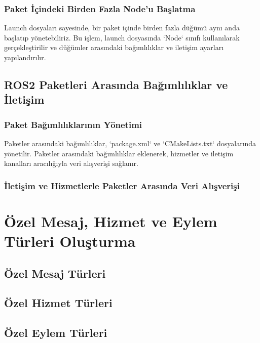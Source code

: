         \subsubsection{Paket İçindeki Birden Fazla Node'u Başlatma}
            Launch dosyaları sayesinde, bir paket içinde birden fazla düğümü aynı anda başlatıp yönetebiliriz. Bu işlem, launch dosyasında `Node` sınıfı kullanılarak gerçekleştirilir ve düğümler arasındaki bağımlılıklar ve iletişim ayarları yapılandırılır.

    \subsection{ROS2 Paketleri Arasında Bağımlılıklar ve İletişim}
        \subsubsection{Paket Bağımlılıklarının Yönetimi}
            Paketler arasındaki bağımlılıklar, `package.xml` ve `CMakeLists.txt` dosyalarında yönetilir. Paketler arasındaki bağımlılıklar eklenerek, hizmetler ve iletişim kanalları aracılığıyla veri alışverişi sağlanır.


\subsubsection{İletişim ve Hizmetlerle Paketler Arasında Veri Alışverişi}

\section{Özel Mesaj, Hizmet ve Eylem Türleri Oluşturma}
\subsection{Özel Mesaj Türleri}

\subsection{Özel Hizmet Türleri}

\subsection{Özel Eylem Türleri}



